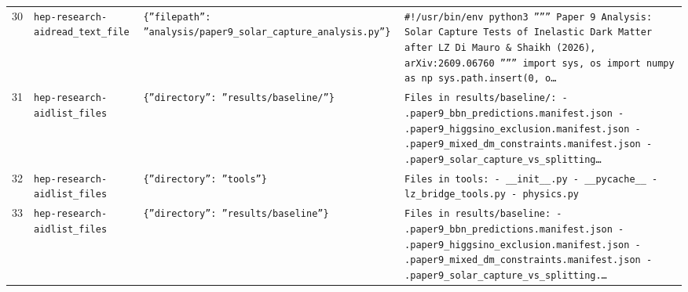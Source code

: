 \documentclass[11pt,a4paper]{article}
\begin{document}
\begin{longtable}{@{}p{}p{}p{}p{}@{}}
30 & \texttt{hep-research-aid}\newline\texttt{read\_\allowbreak{}text\_\allowbreak{}file} & \texttt{\{''filepath'':\allowbreak{} ''analysis/\allowbreak{}paper9\_\allowbreak{}solar\_\allowbreak{}capture\_\allowbreak{}analysis.py''\}\allowbreak{}} & \texttt{\#!/\allowbreak{}usr/\allowbreak{}bin/\allowbreak{}env python3 '''''' Paper 9 Analysis:\allowbreak{} Solar Capture Tests of Inelastic Dark Matter after LZ Di Mauro \& Shaikh (2026)\allowbreak{},\allowbreak{} arXiv:\allowbreak{}2609.06760 '''''' import sys,\allowbreak{} os import numpy as np sys.path.insert(0,\allowbreak{} o\ldots{}\allowbreak{}} \\
31 & \texttt{hep-research-aid}\newline\texttt{list\_\allowbreak{}files} & \texttt{\{''directory'':\allowbreak{} ''results/\allowbreak{}baseline/\allowbreak{}''\}\allowbreak{}} & \texttt{Files in results/\allowbreak{}baseline/\allowbreak{}:\allowbreak{}   - .paper9\_\allowbreak{}bbn\_\allowbreak{}predictions.manifest.json   - .paper9\_\allowbreak{}higgsino\_\allowbreak{}exclusion.manifest.json   - .paper9\_\allowbreak{}mixed\_\allowbreak{}dm\_\allowbreak{}constraints.manifest.json   - .paper9\_\allowbreak{}solar\_\allowbreak{}capture\_\allowbreak{}vs\_\allowbreak{}splitting\ldots{}\allowbreak{}} \\
32 & \texttt{hep-research-aid}\newline\texttt{list\_\allowbreak{}files} & \texttt{\{''directory'':\allowbreak{} ''tools''\}\allowbreak{}} & \texttt{Files in tools:\allowbreak{}   - \_\allowbreak{}\_\allowbreak{}init\_\allowbreak{}\_\allowbreak{}.py   - \_\allowbreak{}\_\allowbreak{}pycache\_\allowbreak{}\_\allowbreak{}   - lz\_\allowbreak{}bridge\_\allowbreak{}tools.py   - physics.py} \\
33 & \texttt{hep-research-aid}\newline\texttt{list\_\allowbreak{}files} & \texttt{\{''directory'':\allowbreak{} ''results/\allowbreak{}baseline''\}\allowbreak{}} & \texttt{Files in results/\allowbreak{}baseline:\allowbreak{}   - .paper9\_\allowbreak{}bbn\_\allowbreak{}predictions.manifest.json   - .paper9\_\allowbreak{}higgsino\_\allowbreak{}exclusion.manifest.json   - .paper9\_\allowbreak{}mixed\_\allowbreak{}dm\_\allowbreak{}constraints.manifest.json   - .paper9\_\allowbreak{}solar\_\allowbreak{}capture\_\allowbreak{}vs\_\allowbreak{}splitting.\ldots{}\allowbreak{}} \\

\end{longtable}
\end{document}
